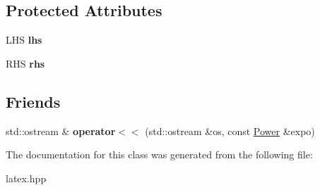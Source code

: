 \subsection*{Protected Attributes}
\begin{DoxyCompactItemize}
\item 
\hypertarget{classlatex_1_1math_1_1Power_aeb8d774a870adda3139d8db8f9dfc870}{L\-H\-S {\bfseries lhs}}\label{classlatex_1_1math_1_1Power_aeb8d774a870adda3139d8db8f9dfc870}

\item 
\hypertarget{classlatex_1_1math_1_1Power_a662655508128a00d8829a724703c1e6f}{R\-H\-S {\bfseries rhs}}\label{classlatex_1_1math_1_1Power_a662655508128a00d8829a724703c1e6f}

\end{DoxyCompactItemize}
\subsection*{Friends}
\begin{DoxyCompactItemize}
\item 
\hypertarget{classlatex_1_1math_1_1Power_accfba4721c0e8444a30731d5fd2c11d8}{std\-::ostream \& {\bfseries operator$<$$<$} (std\-::ostream \&os, const \hyperlink{classlatex_1_1math_1_1Power}{Power} \&expo)}\label{classlatex_1_1math_1_1Power_accfba4721c0e8444a30731d5fd2c11d8}

\end{DoxyCompactItemize}


The documentation for this class was generated from the following file\-:\begin{DoxyCompactItemize}
\item 
latex.\-hpp\end{DoxyCompactItemize}

